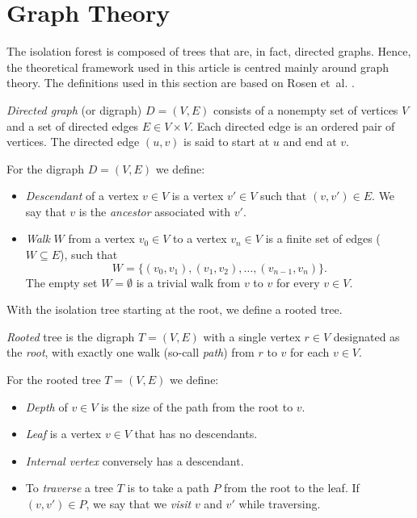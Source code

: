 \section{Graph Theory}
\label{sec:graph_theory}

 The isolation forest is composed of trees that are, in fact, directed graphs.
 Hence, the theoretical framework used in this article is centred mainly around graph theory.
 The definitions used in this section are based on Rosen et~al. \cite{rosen2012discrete}. 


\begin{definition}
 \emph{Directed graph} (or digraph) $D = (V, E)$ consists of a nonempty set of vertices $V$ and a set of directed edges $E \in V \times V$.
 Each directed edge is an ordered pair of vertices.
 The directed edge $(u, v)$ is said to start at $u$ and end at $v$.
\end{definition}


For the digraph $D = (V,E)$ we define:
\begin{itemize}
    \item \emph{Descendant} of a vertex $v \in V$ is a vertex $v' \in V$ such that $(v,v') \in E$. 
    We say that $v$ is the \emph{ancestor} associated with $v'$.
    \item \emph{Walk} $W$ from a vertex $v_0 \in V$ to a vertex $v_n \in V$ is a finite set of edges ($W \subseteq E$), such that $$W = \{(v_0, v_1),(v_1, v_2),\dots,(v_{n-1}, v_n)\}.$$
    The empty set $W = \emptyset$ is a trivial walk from $v$ to $v$ for every $v \in V$. 
\end{itemize}

With the isolation tree starting at the root, we define a rooted tree.

\begin{definition}
\emph{Rooted} tree is the digraph $T = (V,E)$ with a single vertex $r \in V$ designated as the \emph{root}, with exactly one walk (so-call \emph{path}) from $r$ to $v$ for each $v \in V$.
\end{definition}

For the rooted tree $T = (V,E)$ we define:
\begin{itemize}
    \item \emph{Depth} of $v \in V$ is the size of the path from the root to $v$.
    \item \emph{Leaf} is a vertex $v \in V$ that has no descendants. 
    \item \emph{Internal  vertex} conversely has a descendant.
    \item To \emph{traverse} a tree $T$ is to take a path $P$ from the root to the leaf. If $(v,v') \in P$, we say that we \emph{visit} $v$ and $v'$ while traversing.
\end{itemize}
